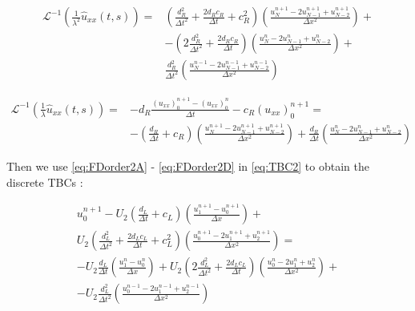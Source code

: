\begin{equation}
     \label{eq:FDorder2C}
         \begin{split}
    \mathcal{L}^{-1} \left( \frac{1}{\lambda^2} \hat{u}_{xx}(t,s) \right) = & \left( \frac{d_R^2}{\Delta t^2} + \frac{2d_Rc_R}{\Delta t} + c_R^2  \right) \left(  \frac{u_{N}^{n+1} - 2u_{N-1}^{n+1} + u_{N-2}^{n+1}}{\Delta x^2} \right) + \\
    			& - \left( 2\frac{d_R^2}{\Delta t^2} + \frac{2d_Rc_R}{\Delta t}\right) \left(  \frac{u_N^{n} - 2u_{N-1}^n + u_{N-2}^{n}}{\Delta x^2} \right) + \\
    			& \frac{d_R^2}{\Delta t^2} \left(  \frac{u_N^{n-1} - 2u_{N-1}^{n-1} + u_{N-2}^{n-1}}{\Delta x^2} \right)
    \end{split}
 \end{equation}
     			
\begin{equation}
     \label{eq:FDorder2D}
         \begin{split}
    \mathcal{L}^{-1} \left( \frac{1}{\lambda} \hat{u}_{xx}(t,s) \right) = & -d_R \frac{ (u_{xx})_0^{n+1} - (u_{xx})_0^n}{\Delta t} - c_R (u_{xx})_0^{n+1} =\\
    			& -\left( \frac{d_R}{\Delta t} + c_R \right) \left( \frac{u_N^{n+1} -2 u_{N-1}^{n+1} + u_{N-2}^{n+1}}{\Delta x^2}\right) + \frac{d_R}{\Delta t}\left( \frac{u_{N}^{n} - 2u_{N-1}^{n} + u_{N-2}^n}{\Delta x^2}\right)
    \end{split}
\end{equation}

\indent Then we use \eqref{eq:FDorder2A} - \eqref{eq:FDorder2D} in \eqref{eq:TBC2} to obtain the discrete TBCs :

\begin{equation}
	\begin{split}
    u_0^{n+1} - U_2\left( \frac{d_L}{\Delta t} + c_L \right) \left( \frac{u_1^{n+1} - u_0^{n+1}}{\Delta x}\right) + \\
     U_2\left( \frac{d_L^2}{\Delta t^2} + \frac{2d_Lc_L}{\Delta t} + c_L^2  \right) \left(  \frac{u_0^{n+1} - 2u_1^{n+1} + u_2^{n+1}}{\Delta x^2} \right) = \\
     -U_2\frac{d_L}{\Delta t}\left( \frac{u_1^{n} - u_0^{n}}{\Delta x}\right) + U_2 \left( 2\frac{d_L^2}{\Delta t^2} + \frac{2d_Lc_L}{\Delta t}\right) \left(  \frac{u_0^{n} - 2u_1^n + u_2^{n}}{\Delta x^2} \right) + \\
     - U_2 \frac{d_L^2}{\Delta t^2} \left(  \frac{u_0^{n-1} - 2u_1^{n-1} + u_2^{n-1}}{\Delta x^2} \right)
   \end{split}
\end{equation} 

